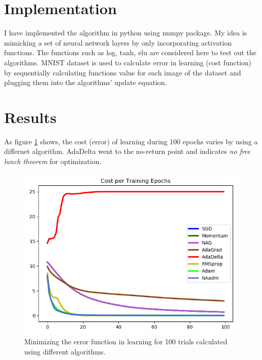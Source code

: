 \documentclass[12pt]{article}
\begin{document}
\section{Implementation}
I have implemented the algorithm in python using numpy package. My idea is mimicking a set of neural network layers by only incorporating activation functions. The functions such as log, tanh, elu are considered here to test out the algorithms. MNIST dataset is used to calculate error in learning (cost function) by sequentially calculating functions value for each image of the dataset and plugging them into the algorithms' update equation.

\section{Results}
As figure \ref{fig:algorithms_cost_function} shows, the cost (error) of learning during 100 epochs varies by using a differnet algorithm. AdaDelta went to the no-return point and indicates \textit{no free lunch theorem} for optimization.
\begin{figure}
    \centering
    \includegraphics[width=1\columnwidth]{presentation/MathOpt-proj/myplot.png}
    \caption{Minimizing the error function in learning for 100 trials calculated using different algorithms.}
    \label{fig:algorithms_cost_function}
\end{figure}




\end{document}
